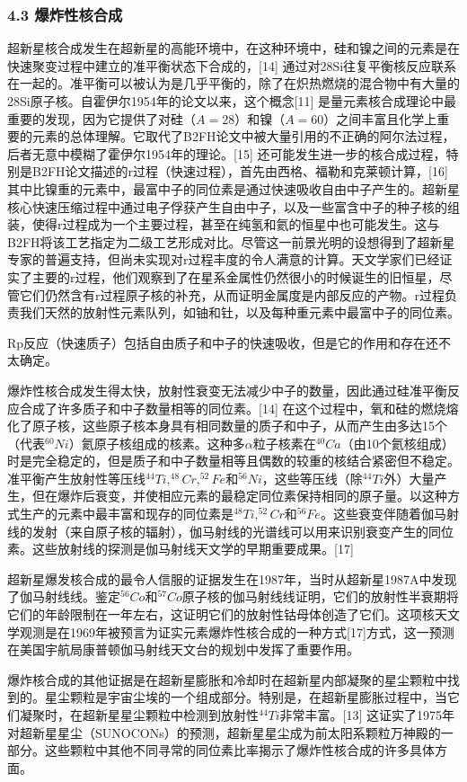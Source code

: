 \subsubsection{4.3 爆炸性核合成}
超新星核合成发生在超新星的高能环境中，在这种环境中，硅和镍之间的元素是在快速聚变过程中建立的准平衡状态下合成的，[14] 通过对28Si往复平衡核反应联系在一起的。准平衡可以被认为是几乎平衡的，除了在炽热燃烧的混合物中有大量的28Si原子核。自霍伊尔1954年的论文以来，这个概念[11] 是量元素核合成理论中最重要的发现，因为它提供了对硅（$A=28$）和镍（$A=60$）之间丰富且化学上重要的元素的总体理解。它取代了B2FH论文中被大量引用的不正确的阿尔法过程，后者无意中模糊了霍伊尔1954年的理论。[15] 还可能发生进一步的核合成过程，特别是B2FH论文描述的r过程（快速过程），首先由西格、福勒和克莱顿计算，[16] 其中比镍重的元素中，最富中子的同位素是通过快速吸收自由中子产生的。超新星核心快速压缩过程中通过电子俘获产生自由中子，以及一些富含中子的种子核的组装，使得r过程成为一个主要过程，甚至在纯氢和氦的恒星中也可能发生。这与B2FH将该工艺指定为二级工艺形成对比。尽管这一前景光明的设想得到了超新星专家的普遍支持，但尚未实现对r过程丰度的令人满意的计算。天文学家们已经证实了主要的r过程，他们观察到了在星系金属性仍然很小的时候诞生的旧恒星，尽管它们仍然含有r过程原子核的补充，从而证明金属度是内部反应的产物。r过程负责我们天然的放射性元素队列，如铀和钍，以及每种重元素中最富中子的同位素。

Rp反应（快速质子）包括自由质子和中子的快速吸收，但是它的作用和存在还不太确定。

爆炸性核合成发生得太快，放射性衰变无法减少中子的数量，因此通过硅准平衡反应合成了许多质子和中子数量相等的同位素。[14] 在这个过程中，氧和硅的燃烧熔化了原子核，这些原子核本身具有相同数量的质子和中子，从而产生由多达15个（代表$^{60}Ni$）氦原子核组成的核素。这种多$\alpha$粒子核素在$^{40}Ca$（由10个氦核组成）时是完全稳定的，但是质子和中子数量相等且偶数的较重的核结合紧密但不稳定。准平衡产生放射性等压线$^{44}Ti,^{48}Cr,^{52}Fe$和$^{56}Ni$，这些等压线（除$^{44}Ti$外）大量产生，但在爆炸后衰变，并使相应元素的最稳定同位素保持相同的原子量。以这种方式生产的元素中最丰富和现存的同位素是$^{48}Ti,^{52}Cr$和$^{56}Fe$。这些衰变伴随着伽马射线的发射（来自原子核的辐射），伽马射线的光谱线可以用来识别衰变产生的同位素。这些放射线的探测是伽马射线天文学的早期重要成果。[17]

超新星爆发核合成的最令人信服的证据发生在1987年，当时从超新星1987A中发现了伽马射线线。鉴定$^{56}Co$和$^{57}Co$原子核的伽马射线线证明，它们的放射性半衰期将它们的年龄限制在一年左右，这证明它们的放射性钴母体创造了它们。这项核天文学观测是在1969年被预言为证实元素爆炸性核合成的一种方式[17]方式，这一预测在美国宇航局康普顿伽马射线天文台的规划中发挥了重要作用。

爆炸核合成的其他证据是在超新星膨胀和冷却时在超新星内部凝聚的星尘颗粒中找到的。星尘颗粒是宇宙尘埃的一个组成部分。特别是，在超新星膨胀过程中，当它们凝聚时，在超新星星尘颗粒中检测到放射性$^{44}Ti$非常丰富。[13] 这证实了1975年对超新星星尘（SUNOCONs）的预测，超新星星尘成为前太阳系颗粒万神殿的一部分。这些颗粒中其他不同寻常的同位素比率揭示了爆炸性核合成的许多具体方面。